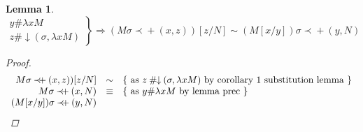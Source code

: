 \documentclass{article}
\newcommand{\add}[3]{\ensuremath{#1\mathbin{\prec\!\!\!+}(#2,#3)}}
\newcommand{\lam}{\ensuremath{\lambda}}
\newcommand{\alpsy}{\ensuremath{\sim}}
\newcommand{\then}{\ensuremath{\Rightarrow}}
\newcommand{\freshr}[3]{\ensuremath{#1 \mathbin{\#\!\!\downarrow}(#2,#3)}}
\newtheorem{lem}{Lemma}
\begin{document}

\begin{lem}{$ \left.
    \begin{array}{l}
      y \# \lam x M \\
      \freshr{z}{\sigma}{\lam x M}
    \end{array} \right\}
  \then (M \add{\sigma}{x}{z}) [z / N] \alpsy (M [x / y]) \add{\sigma}{y}{N}$}
\label{alphasubstcomposition}
\begin{proof}
      \[
      \begin{array}{rcl}
         M \add{\sigma}{x}{z}) [z / N] & \alpsy& \{ \text{ as \freshr{z}{\sigma}{\lam x M}\ by corollary 1 substitution lemma }  \} \\
         M \add{\sigma}{x}{N}  & \equiv & \{\text{ as $y \# \lam x M$\ by lemma prec } \} \\ %
         (M [x / y]) \add{\sigma}{y}{N} & &
      \end{array}
      \]
\end{proof}
\end{lem}

\end{document}
